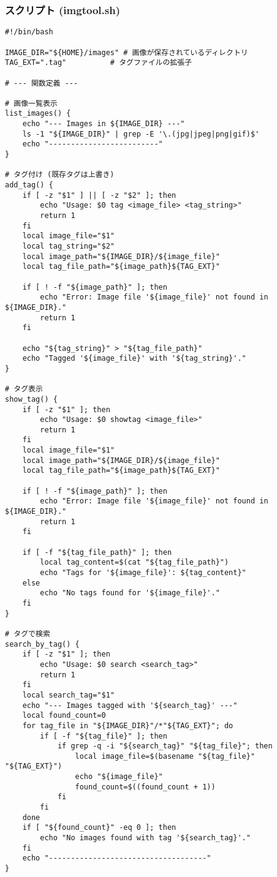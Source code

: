 \documentclass[a4paper,11pt]{jsarticle}
\begin{document}
\subsubsection*{スクリプト (imgtool.sh)}
\begin{lstlisting}[caption=演習17 画像管理スクリプト `imgtool.sh`]
#!/bin/bash

IMAGE_DIR="${HOME}/images" # 画像が保存されているディレクトリ
TAG_EXT=".tag"          # タグファイルの拡張子

# --- 関数定義 ---

# 画像一覧表示
list_images() {
    echo "--- Images in ${IMAGE_DIR} ---"
    ls -1 "${IMAGE_DIR}" | grep -E '\.(jpg|jpeg|png|gif)$'
    echo "-------------------------"
}

# タグ付け (既存タグは上書き)
add_tag() {
    if [ -z "$1" ] || [ -z "$2" ]; then
        echo "Usage: $0 tag <image_file> <tag_string>"
        return 1
    fi
    local image_file="$1"
    local tag_string="$2"
    local image_path="${IMAGE_DIR}/${image_file}"
    local tag_file_path="${image_path}${TAG_EXT}"

    if [ ! -f "${image_path}" ]; then
        echo "Error: Image file '${image_file}' not found in ${IMAGE_DIR}."
        return 1
    fi

    echo "${tag_string}" > "${tag_file_path}"
    echo "Tagged '${image_file}' with '${tag_string}'."
}

# タグ表示
show_tag() {
    if [ -z "$1" ]; then
        echo "Usage: $0 showtag <image_file>"
        return 1
    fi
    local image_file="$1"
    local image_path="${IMAGE_DIR}/${image_file}"
    local tag_file_path="${image_path}${TAG_EXT}"

    if [ ! -f "${image_path}" ]; then
        echo "Error: Image file '${image_file}' not found in ${IMAGE_DIR}."
        return 1
    fi

    if [ -f "${tag_file_path}" ]; then
        local tag_content=$(cat "${tag_file_path}")
        echo "Tags for '${image_file}': ${tag_content}"
    else
        echo "No tags found for '${image_file}'."
    fi
}

# タグで検索
search_by_tag() {
    if [ -z "$1" ]; then
        echo "Usage: $0 search <search_tag>"
        return 1
    fi
    local search_tag="$1"
    echo "--- Images tagged with '${search_tag}' ---"
    local found_count=0
    for tag_file in "${IMAGE_DIR}"/*"${TAG_EXT}"; do
        if [ -f "${tag_file}" ]; then
            if grep -q -i "${search_tag}" "${tag_file}"; then
                local image_file=$(basename "${tag_file}" "${TAG_EXT}")
                echo "${image_file}"
                found_count=$((found_count + 1))
            fi
        fi
    done
    if [ "${found_count}" -eq 0 ]; then
        echo "No images found with tag '${search_tag}'."
    fi
    echo "------------------------------------"
}


\end{lstlisting}
\end{document}

